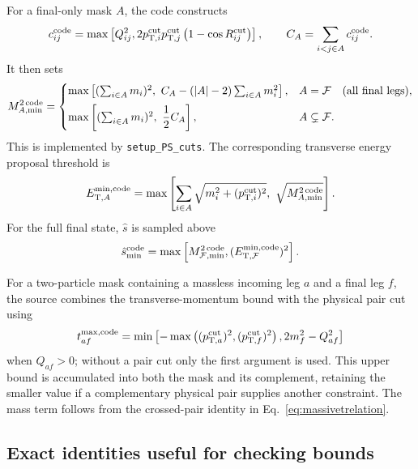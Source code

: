 \documentclass[11pt,a4paper]{article}
\newcommand{\shat}{\hat{s}}
\newcommand{\code}[1]{\texttt{#1}}
\newcommand{\mc}[1]{\mathcal{#1}}
\begin{document}
For a final-only mask $A$, the code constructs
\begin{equation}
 c_{ij}^{\rm code}=\max\left[Q_{ij}^2,
 2p_{\mathrm{T},i}^{\rm cut}p_{\mathrm{T},j}^{\rm cut}
 \left(1-\cos R_{ij}^{\rm cut}\right)\right],
 \qquad C_A=\sum_{i<j\in A}c_{ij}^{\rm code}.
 \label{eq:codepairbound}
\end{equation}
It then sets
\begin{equation}
 M_{A,\min}^{2\,\rm code}=
 \begin{cases}
 \max\left[(\sum_{i\in A}m_i)^2,\ C_A-(|A|-2)\sum_{i\in A}m_i^2\right],
      &A=\mc F\quad\hbox{(all final legs)},\\[1.1ex]
 \max\left[(\sum_{i\in A}m_i)^2,\ \dfrac12 C_A\right],
      &A\subsetneq\mc F.
 \end{cases}
 \label{eq:codeaggregatebound}
\end{equation}
This is implemented by \code{setup\_PS\_cuts}.  The corresponding transverse
energy proposal threshold is
\begin{equation}
 E_{\mathrm{T},A}^{\min,\rm code}=\max\left[\sum_{i\in A}\sqrt{m_i^2+(p_{\mathrm{T},i}^{\rm cut})^2},\
 \sqrt{M_{A,\min}^{2\,\rm code}}\right].
 \label{eq:etmin}
\end{equation}
For the full final state, $\shat$ is sampled above
\begin{equation}
 \hat{s}_{\min}^{\rm code}=\max\left[M_{\mc F,\min}^{2\,\rm code},
 (E_{\mathrm{T},\mc F}^{\min,\rm code})^2\right].
 \label{eq:shatmincode}
\end{equation}

For a two-particle mask containing a massless incoming leg $a$ and a final leg
$f$, the source combines the transverse-momentum bound with the physical pair
cut using
\begin{equation}
 t_{af}^{\max,\rm code}=\min\left[-\max\left(
 (p_{\mathrm{T},a}^{\rm cut})^2,(p_{\mathrm{T},f}^{\rm cut})^2\right),
 2m_f^2-Q_{af}^2\right]
 \label{eq:tcutcode}
\end{equation}
when $Q_{af}>0$; without a pair cut only the first argument is used.  This
upper bound is accumulated into both the mask and its complement, retaining
the smaller value if a complementary physical pair supplies another
constraint.  The mass term follows from the crossed-pair identity in
Eq.~\eqref{eq:massivetrelation}.

\subsection{Exact identities useful for checking bounds}
\end{document}
